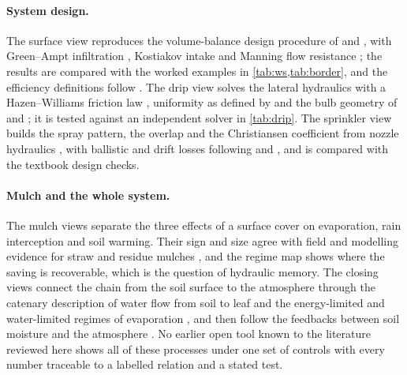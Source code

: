 \documentclass[preprint,12pt]{elsarticle}
\begin{document}
\paragraph{System design.} The surface view reproduces the volume-balance design procedure of \cite{Walker1989} and \cite{Elliott1982}, with Green--Ampt infiltration \cite{GreenAmpt1911}, Kostiakov intake \cite{Kostiakov1932} and Manning flow resistance \cite{Manning1891}; the results are compared with the worked examples in \cref{tab:ws,tab:border}, and the efficiency definitions follow \cite{Burt1997}. The drip view solves the lateral hydraulics with a Hazen--Williams friction law \cite{Hazen1905}, uniformity as defined by \cite{KellerKarmeli1974} and the bulb geometry of \cite{Warrick1988} and \cite{Schwartzman1986}; it is tested against an independent solver in \cref{tab:drip}. The sprinkler view builds the spray pattern, the overlap and the Christiansen coefficient \cite{Christiansen1942} from nozzle hydraulics \cite{Keller1990}, with ballistic and drift losses following \cite{Playan2005} and \cite{Dechmi2003}, and is compared with the textbook design checks.

\paragraph{Mulch and the whole system.} The mulch views separate the three effects of a surface cover on evaporation, rain interception and soil warming. Their sign and size agree with field and modelling evidence for straw and residue mulches \cite{BalwinderSingh2011,Zheng2021,Vuaille2024,Kang2024}, and the regime map shows where the saving is recoverable, which is the question of hydraulic memory. The closing views connect the chain from the soil surface to the atmosphere through the catenary description of water flow from soil to leaf \cite{vandenHonert1948,Nobel2009} and the energy-limited and water-limited regimes of evaporation \cite{Roderick2002,Seneviratne2010}, and then follow the feedbacks between soil moisture and the atmosphere \cite{Entekhabi1996,Koster2004}. No earlier open tool known to the literature reviewed here shows all of these processes under one set of controls with every number traceable to a labelled relation and a stated test.
\end{document}
